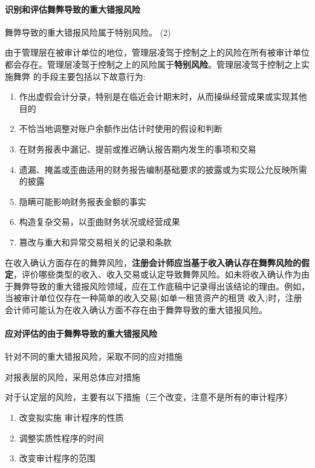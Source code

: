\documentclass[UTF8,12pt]{ctexart}
\numberwithin{equation}{section} %
\numberwithin{figure}{section}
\numberwithin{table}{section}
\begin{document}
	\paragraph{识别和评估舞弊导致的重大错报风险}
	
	舞弊导致的重大错报风险属于特别风险。 (2)
	
	由于管理层在被审计单位的地位，管理层凌驾于控制之上的风险在所有被审计单位都会存在。管理层凌驾于控制之上的风险属于\textbf{特别风险}。管理层凌驾于控制之上实施舞弊 的手段主要包括以下故意行为:
	\begin{enumerate}
		\item 作出虚假会计分录，特别是在临近会计期末时，从而操纵经营成果或实现其他目的
		
		\item 不恰当地调整对账户余额作出估计时使用的假设和判断
		
		\item 在财务报表中漏记、提前或推迟确认报告期内发生的事项和交易
		
		\item 遗漏、掩盖或歪曲适用的财务报告编制基础要求的披露或为实现公允反映所需的披露
		
		\item 隐瞒可能影响财务报表金额的事实
		
		\item 构造复杂交易，以歪曲财务状况或经营成果
		
		\item 篡改与重大和异常交易相关的记录和条款
	\end{enumerate}
	
	在收入确认方面存在的舞弊风险，\textbf{注册会计师应当基于收入确认存在舞弊风险的假定}，评价哪些类型的收入、收入交易或认定导致舞弊风险。如未将收入确认作为由于舞弊导致的重大错报风险领域，应在工作底稿中记录得出该结论的理由。例如，当被审计单位仅存在一种简单的收入交易(如单一租赁资产的租赁 收入)时，注册会计师可能认为在收入确认方面不存在由于舞弊导致的重大错报风险。
	
	\paragraph{应对评估的由于舞弊导致的重大错报风险}
	针对不同的重大错报风险，采取不同的应对措施
	
	对报表层的风险，采用总体应对措施
	
	对于认定层的风险，主要有以下措施（三个改变，注意不是所有的审计程序）
	\begin{enumerate}
		\item 改变拟实施 审计程序的性质
		
		\item 调整实质性程序的时间
		
		\item 改变审计程序的范围
	\end{enumerate}
	
\end{document}
